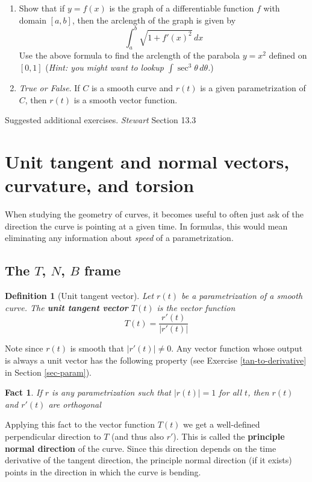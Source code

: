 \documentclass[12pt]{article}
\numberwithin{equation}{subsection}
\numberwithin{figure}{subsection}
\newtheorem{defn}[subsection]{Definition}
\newtheorem{fact}[subsection]{Fact}
\theoremstyle{note}
\begin{document}
{\begin{enumerate}[label=\arabic*.]
\item Show that if $y=f(x)$ is the graph of a differentiable function $f$ with domain $[a,b]$, then the arclength of the graph is given by \begin{equation} \int_a^b \sqrt{1+f'(x)^2}\,dx\end{equation}
Use the above formula to find the arclength of the parabola $y=x^2$ defined on $[0,1]$ (\textit{Hint: you might want to lookup $\displaystyle \int \sec^3\theta\,d \theta$.}) 

\item \textit{True or False}. If $C$ is a smooth curve and $r(t)$ is a given parametrization of $C$, then $r(t)$ is a smooth vector function. 
\end{enumerate}

Suggested additional exercises. \textit{Stewart} Section 13.3 

\section[Curvature]{Unit tangent and normal vectors, curvature, and torsion} \label{sec-curvature}

When studying the geometry of curves, it becomes useful to often just ask of the direction the curve is pointing at a given time. In formulas, this would mean eliminating any information about \textit{speed} of a parametrization. 

\subsection{The $T$, $N$, $B$ frame}
\begin{defn}[Unit tangent vector]Let $r(t)$ be a parametrization of a smooth curve. The \textbf{unit tangent vector} $T(t)$ is the vector function \begin{equation} \label{unit-tangent} T(t)= \dfrac{r'(t)}{|r'(t)|} \end{equation}
\end{defn}

Note  since $r(t)$ is smooth that $|r'(t)|\neq 0$. Any vector function whose output is always a unit vector has the following property (see Exercise \ref{tan-to-derivative} in Section \ref{sec-param}). 
\begin{fact} If $r$ is any parametrization such that $|r(t)|=1$ for all $t$, then $r(t)$ and $r'(t)$ are orthogonal\end{fact} 
Applying this fact to the vector function $T(t)$ we get a well-defined perpendicular direction to $T$ (and thus also $r'$). This is called the \textbf{principle normal direction} of the curve. Since this direction depends on the time derivative of the tangent direction, the principle normal direction (if it exists) points in the direction in which the curve is bending. 

}
\end{document}
